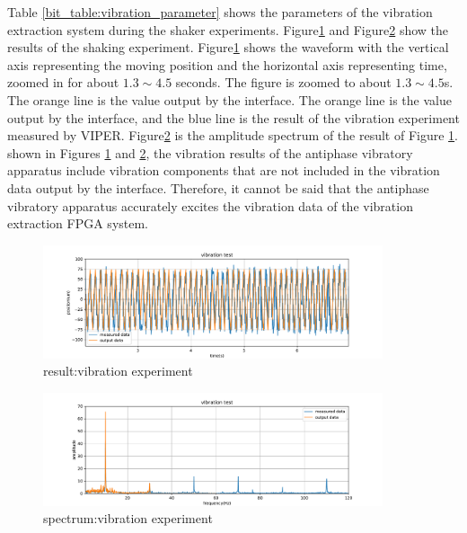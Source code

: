 Table \ref{bit_table:vibration_parameter} shows the parameters of the vibration extraction system during the shaker experiments.
Figure\ref{figure:supp_eval:vibration_test_result} and Figure\ref{figure:supp_eval:vibration_test_result_fft} show
the results of the shaking experiment. Figure\ref{figure:supp_eval:vibration_test_result} shows the waveform with
the vertical axis representing the moving position and the horizontal axis representing time,
zoomed in for about $1.3 \sim 4.5$ seconds.
The figure is zoomed to about $1.3 \sim 4.5$s.
The orange line is the value output by the interface.
The orange line is the value output by the interface, and the blue line is the result of the vibration experiment measured by VIPER.
Figure\ref{figure:supp_eval:vibration_test_result_fft} is the amplitude spectrum of the result of Figure \ref{figure:supp_eval:vibration_test_result}.
shown in Figures \ref{figure:supp_eval:vibration_test_result} and \ref{figure:supp_eval:vibration_test_result_fft},
the vibration results of the antiphase vibratory apparatus include vibration components that are not included
in the vibration data output by the interface.
Therefore, it cannot be said that the antiphase vibratory apparatus accurately excites the
vibration data of the vibration extraction FPGA system.



\begin{figure}[tb]
  \centering
  \includegraphics[width = 10cm,pagebox=cropbox,clip]{img/Supdevice_result.pdf}
  \caption{result:vibration experiment}
  \label{figure:supp_eval:vibration_test_result}
\end{figure}

\begin{figure}[tb]
  \centering
  \includegraphics[width = 10cm,pagebox=cropbox,clip]{img/Supdevice_result_fft.pdf}
  \caption{spectrum:vibration experiment}
  \label{figure:supp_eval:vibration_test_result_fft}
\end{figure}








